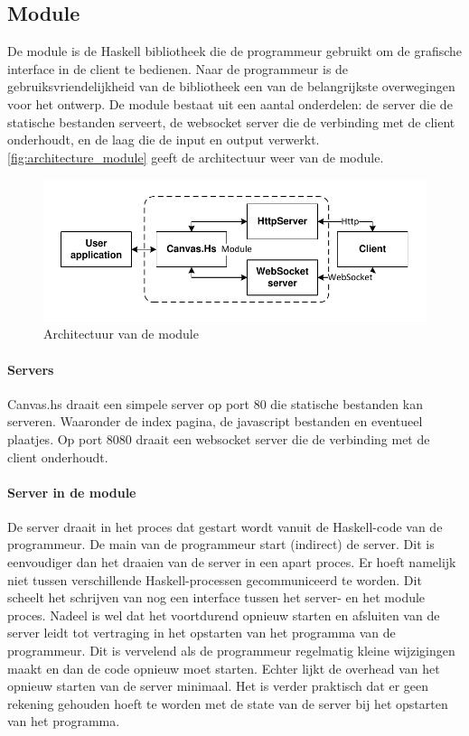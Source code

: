 \subsection{Module}
De module is de Haskell bibliotheek die de programmeur gebruikt om de grafische interface in de client te bedienen. Naar de programmeur is de gebruiksvriendelijkheid van de bibliotheek een van de belangrijkste overwegingen voor het ontwerp. De module bestaat uit een aantal onderdelen: de server die de statische bestanden serveert, de websocket server die de verbinding met de client onderhoudt, en de laag die de input en output verwerkt. \autoref{fig:architecture_module} geeft de architectuur weer van de module.

\begin{figure}
\begin{center}
\includegraphics[keepaspectratio,width=\textwidth]{./images/module_architecture.pdf}
\caption{Architectuur van de module}
\label{fig:architecture_module}
\end{center}
\end{figure}

\paragraph{Servers}
Canvas.hs draait een simpele server op port 80 die statische bestanden kan serveren. Waaronder de index pagina, de javascript bestanden en eventueel plaatjes. Op port 8080 draait een websocket server die de verbinding met de client onderhoudt.


\paragraph{Server in de module}
De server draait in het proces dat gestart wordt vanuit de Haskell-code van de programmeur. De main van de programmeur start (indirect) de server. Dit is eenvoudiger dan het draaien van de server in een apart proces. Er hoeft namelijk niet tussen verschillende Haskell-processen gecommuniceerd te worden. Dit scheelt het schrijven van nog een interface tussen het server- en het module proces. Nadeel is wel dat het voortdurend opnieuw starten en afsluiten van de server leidt tot vertraging in het opstarten van het programma van de programmeur. Dit is vervelend als de programmeur regelmatig kleine wijzigingen maakt en dan de code opnieuw moet starten. Echter lijkt de overhead van het opnieuw starten van de server minimaal. Het is verder praktisch dat er geen rekening gehouden hoeft te worden met de state van de server bij het opstarten van het programma.

